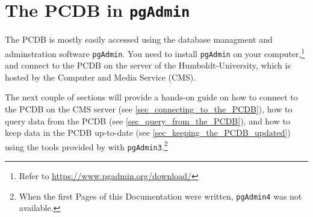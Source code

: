 \chapter{The PCDB in \texttt{\bf pgAdmin}}\label{chap_the_PCDB_in_pgAdmin}

The PCDB is mostly easily accessed using the database managment and adminstration software \texttt{pgAdmin}.
You need to install \texttt{pgAdmin} on your computer,\footnote{Refer to \url{https://www.pgadmin.org/download/}} and connect to the PCDB on the server of the Humboldt-University, which is hosted by the Computer and Media Service (CMS).

The next couple of sections will provide a hands-on guide on 
how to connect to the PCDB on the CMS server (see \ref{sec_connecting_to_the_PCDB}),
how to query data from the PCDB (see \ref{sec_query_from_the_PCDB}), and
how to keep data in the PCDB up-to-date (see \ref{sec_keeping_the_PCDB_updated})
using the tools provided by with \texttt{pgAdmin3}.\footnote{When the first Pages of this Documentation were written, \texttt{pgAdmin4} was not available.}


